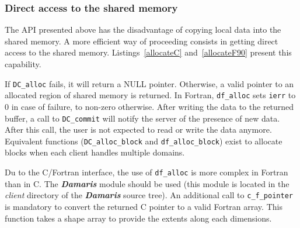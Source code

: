 \documentclass[11pt]{report}
\newcommand{\Damaris}{\emph{\textbf{Damaris}}}
\newcommand{\file}[1]{\emph{#1}}
\newcommand{\function}[1]{\texttt{#1}}
\begin{document}
\subsubsection{Direct access to the shared memory}

The API presented above has the disadvantage of copying local data into the shared memory.
A more efficient way of proceeding consists in getting direct access to the shared memory.
Listings~\ref{allocateC} and~\ref{allocateF90} present this capability.

If \function{DC\_alloc} fails, it will return a NULL pointer. Otherwise, a valid pointer
to an allocated region of shared memory is returned. In Fortran, \function{df\_alloc} sets \texttt{ierr}
to 0 in case of failure, to non-zero otherwise.
After writing the data to the returned buffer, a call to \function{DC\_commit} will notify the server
of the presence of new data. After this call, the user is not expected to read or write the data anymore.
Equivalent functions (\function{DC\_alloc\_block} and \function{df\_alloc\_block}) exist to allocate blocks
when each client handles multiple domains.

\noindent\begin{minipage}{\textwidth}
\vspace{0.5cm}

\end{minipage}

\noindent\begin{minipage}{\textwidth}

\end{minipage}

Du to the C/Fortran interface, the use of \function{df\_alloc} is more complex in Fortran than in C.
The \Damaris{} module should be used (this module is located in the \file{client} directory of the \Damaris{}
source tree). An additional call to \function{c\_f\_pointer} is mandatory to convert the returned C pointer
to a valid Fortran array. This function takes a shape array to provide the extents along each dimensions.
\end{document}
